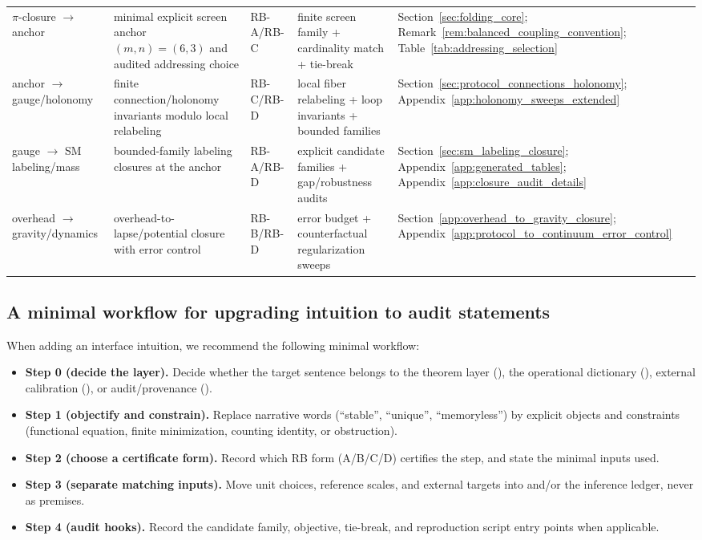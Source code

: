 \begin{center}
\begin{tabular}{p{} p{} p{} p{} p{}}
$\pi$-closure $\to$ anchor &
minimal explicit screen anchor $(m,n)=(6,3)$ and audited addressing choice &
RB-A/RB-C &
finite screen family + cardinality match + tie-break &
Section~\ref{sec:folding_core}; Remark~\ref{rem:balanced_coupling_convention}; Table~\ref{tab:addressing_selection} \\

anchor $\to$ gauge/holonomy &
finite connection/holonomy invariants modulo local relabeling &
RB-C/RB-D &
local fiber relabeling + loop invariants + bounded families &
Section~\ref{sec:protocol_connections_holonomy}; Appendix~\ref{app:holonomy_sweeps_extended} \\

gauge $\to$ SM labeling/mass &
bounded-family labeling closures at the anchor &
RB-A/RB-D &
explicit candidate families + gap/robustness audits &
Section~\ref{sec:sm_labeling_closure}; Appendix~\ref{app:generated_tables}; Appendix~\ref{app:closure_audit_details} \\

overhead $\to$ gravity/dynamics &
overhead-to-lapse/potential closure with error control &
RB-B/RB-D &
error budget + counterfactual regularization sweeps &
Section~\ref{app:overhead_to_gravity_closure}; Appendix~\ref{app:protocol_to_continuum_error_control} \\
\bottomrule
\end{tabular}
\end{center}

\subsection{A minimal workflow for upgrading intuition to audit statements}
\label{subsec:rb_workflow}

\AuditTag When adding an interface intuition, we recommend the following minimal workflow:
\begin{itemize}
  \item \textbf{Step 0 (decide the layer).} Decide whether the target sentence belongs to the theorem layer (\MathTag), the operational dictionary (\InterfaceTag), external calibration (\MatchTag), or audit/provenance (\AuditTag).
  \item \textbf{Step 1 (objectify and constrain).} Replace narrative words (``stable'', ``unique'', ``memoryless'') by explicit objects and constraints (functional equation, finite minimization, counting identity, or obstruction).
  \item \textbf{Step 2 (choose a certificate form).} Record which RB form (A/B/C/D) certifies the step, and state the minimal inputs used.
  \item \textbf{Step 3 (separate matching inputs).} Move unit choices, reference scales, and external targets into \MatchTag and/or the inference ledger, never as premises.
  \item \textbf{Step 4 (audit hooks).} Record the candidate family, objective, tie-break, and reproduction script entry points when applicable.
\end{itemize}



